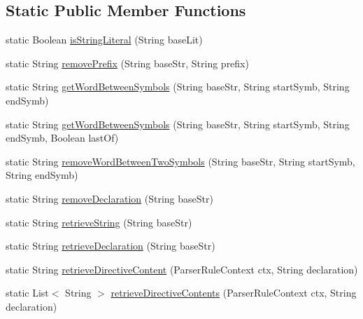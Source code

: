 \subsection*{Static Public Member Functions}
\begin{DoxyCompactItemize}
\item 
static Boolean \hyperlink{classit_1_1emarolab_1_1cagg_1_1core_1_1language_1_1parser_1_1TextualParser_aa439fccd0ee28a5ba52809b24312ad56}{is\-String\-Literal} (String base\-Lit)
\item 
static String \hyperlink{classit_1_1emarolab_1_1cagg_1_1core_1_1language_1_1parser_1_1TextualParser_a8f306a0a12eda22ed96140516c708578}{remove\-Prefix} (String base\-Str, String prefix)
\item 
static String \hyperlink{classit_1_1emarolab_1_1cagg_1_1core_1_1language_1_1parser_1_1TextualParser_ad037508d30fc47f879348055b875c31b}{get\-Word\-Between\-Symbols} (String base\-Str, String start\-Symb, String end\-Symb)
\item 
static String \hyperlink{classit_1_1emarolab_1_1cagg_1_1core_1_1language_1_1parser_1_1TextualParser_aaee6178ea848df1b9ec2bb52a007800f}{get\-Word\-Between\-Symbols} (String base\-Str, String start\-Symb, String end\-Symb, Boolean last\-Of)
\item 
static String \hyperlink{classit_1_1emarolab_1_1cagg_1_1core_1_1language_1_1parser_1_1TextualParser_a455e463ffc902a96273f8c415e6fdac4}{remove\-Word\-Between\-Two\-Symbols} (String base\-Str, String start\-Symb, String end\-Symb)
\item 
static String \hyperlink{classit_1_1emarolab_1_1cagg_1_1core_1_1language_1_1parser_1_1TextualParser_afc9699817effc3691e85e5b2ab49e6cf}{remove\-Declaration} (String base\-Str)
\item 
static String \hyperlink{classit_1_1emarolab_1_1cagg_1_1core_1_1language_1_1parser_1_1TextualParser_a96d5c4a6eeb211ea5cca81b9edfe932a}{retrieve\-String} (String base\-Str)
\item 
static String \hyperlink{classit_1_1emarolab_1_1cagg_1_1core_1_1language_1_1parser_1_1TextualParser_a7a131de61ed1326cfe72b187b917e3be}{retrieve\-Declaration} (String base\-Str)
\item 
static String \hyperlink{classit_1_1emarolab_1_1cagg_1_1core_1_1language_1_1parser_1_1TextualParser_ab12749c2e62641fa188c3cb77c45f9d8}{retrieve\-Directive\-Content} (Parser\-Rule\-Context ctx, String declaration)
\item 
static List$<$ String $>$ \hyperlink{classit_1_1emarolab_1_1cagg_1_1core_1_1language_1_1parser_1_1TextualParser_aac0da05e4f1c22362136a2ed8a54e347}{retrieve\-Directive\-Contents} (Parser\-Rule\-Context ctx, String declaration)
\end{DoxyCompactItemize}
